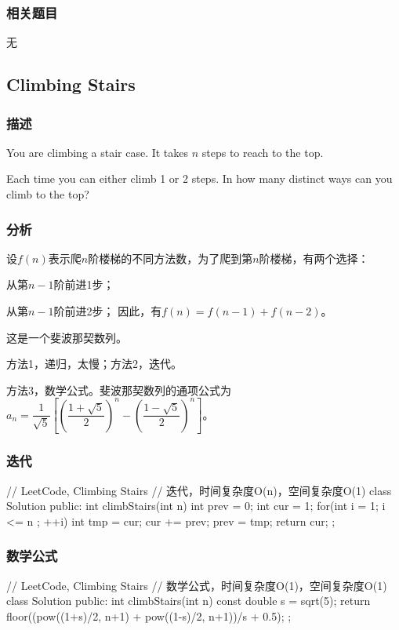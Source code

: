 \subsubsection{相关题目}
\begindot
\item 无
\myenddot


\subsection{Climbing Stairs} %
\label{sec:climbing-stairs}


\subsubsection{描述}
You are climbing a stair case. It takes $n$ steps to reach to the top.

Each time you can either climb 1 or 2 steps. In how many distinct ways can you climb to the top?


\subsubsection{分析}
设$f(n)$表示爬$n$阶楼梯的不同方法数，为了爬到第$n$阶楼梯，有两个选择：
\begindot
\item 从第$n-1$阶前进1步；
\item 从第$n-1$阶前进2步；
\myenddot
因此，有$f(n)=f(n-1)+f(n-2)$。

这是一个斐波那契数列。

方法1，递归，太慢；方法2，迭代。

方法3，数学公式。斐波那契数列的通项公式为 $a_n=\dfrac{1}{\sqrt{5}}\left[\left(\dfrac{1+\sqrt{5}}{2}\right)^n-\left(\dfrac{1-\sqrt{5}}{2}\right)^n\right]$。


\subsubsection{迭代}
\begin{Code}
// LeetCode, Climbing Stairs
// 迭代，时间复杂度O(n)，空间复杂度O(1)
class Solution {
public:
    int climbStairs(int n) {
        int prev = 0;
        int cur = 1;
        for(int i = 1; i <= n ; ++i){
            int tmp = cur;
            cur += prev;
            prev = tmp;
        }
        return cur;
    }
};
\end{Code}


\subsubsection{数学公式}
\begin{Code}
// LeetCode, Climbing Stairs
// 数学公式，时间复杂度O(1)，空间复杂度O(1)
class Solution {
    public:
    int climbStairs(int n) {
        const double s = sqrt(5);
        return floor((pow((1+s)/2, n+1) + pow((1-s)/2, n+1))/s + 0.5);
    }
};
\end{Code}


